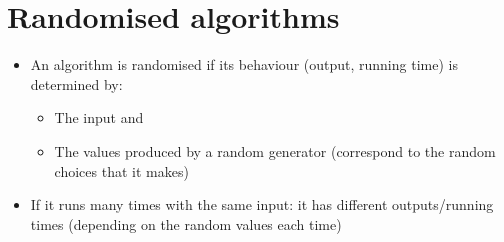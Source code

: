 \documentclass{article}[18pt]
\begin{document}
\section{Randomised algorithms}
\begin{itemize}
	\item An algorithm is randomised if its behaviour (output, running time) is determined by:
	\begin{itemize}
		\item The input and
		\item The values produced by a random generator (correspond to the random choices that it makes)
	\end{itemize}
	\item If it runs many times with the same input: it has different outputs/running times (depending on the random values each time)
\end{itemize}
\end{document}
